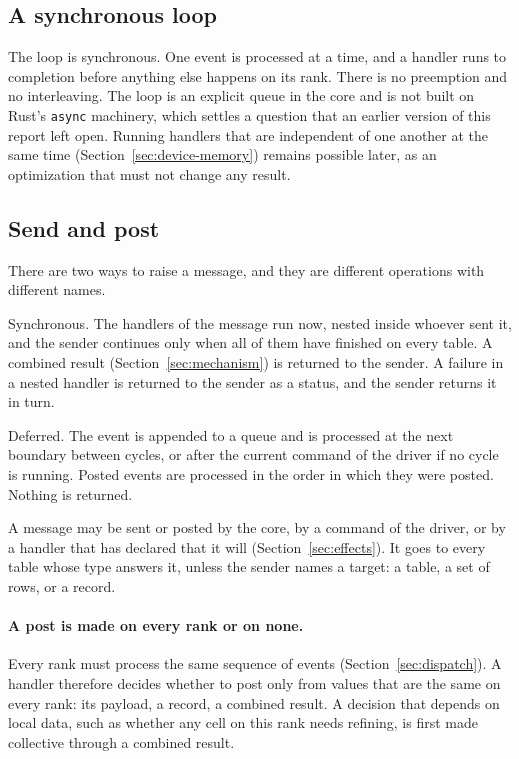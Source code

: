 \documentclass[11pt,a4paper]{article}
\newcommand{\code}[1]{\texttt{#1}}
\begin{document}
\subsection{A synchronous loop}
\label{sec:synchronous}

The loop is synchronous.  One event is processed at a time, and a handler
runs to completion before anything else happens on its rank.  There is no
preemption and no interleaving.  The loop is an explicit queue in the core
and is not built on Rust's \code{async} machinery, which settles a question
that an earlier version of this report left open.  Running handlers that are
independent of one another at the same time
(Section~\ref{sec:device-memory}) remains possible later, as an optimization
that must not change any result.

\subsection{Send and post}
\label{sec:send-post}

There are two ways to raise a message, and they are different operations
with different names.

\begin{description}[style=nextline,leftmargin=2em]
  \item[Send.]
        Synchronous.  The handlers of the message run now, nested inside
        whoever sent it, and the sender continues only when all of them
        have finished on every table.  A combined result
        (Section~\ref{sec:mechanism}) is returned to the sender.  A failure
        in a nested handler is returned to the sender as a status, and the
        sender returns it in turn.
  \item[Post.]
        Deferred.  The event is appended to a queue and is processed at the
        next boundary between cycles, or after the current command of the
        driver if no cycle is running.  Posted events are processed in the
        order in which they were posted.  Nothing is returned.
\end{description}

A message may be sent or posted by the core, by a command of the driver, or
by a handler that has declared that it will (Section~\ref{sec:effects}).
It goes to every table whose type answers it, unless the sender names a
target: a table, a set of rows, or a record.

\paragraph{A post is made on every rank or on none.}  Every rank must
process the same sequence of events (Section~\ref{sec:dispatch}).  A handler
therefore decides whether to post only from values that are the same on
every rank: its payload, a record, a combined result.  A decision that
depends on local data, such as whether any cell on this rank needs refining,
is first made collective through a combined result.
\end{document}
